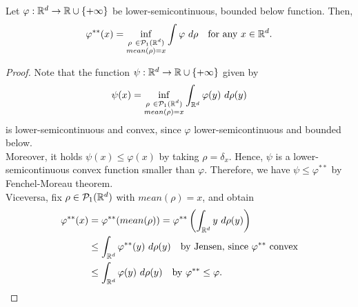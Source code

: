 \documentclass[../main.tex]{subfiles}
\begin{document}
\begin{lemma}
    \label{lemma:Fenchel-Moreau_cor}
    Let $\varphi: \mathbb{R}^d \to \mathbb{R}\cup\{+\infty\}$ be lower-semicontinuous, bounded below function. Then, 
    $$
    \varphi^{**}(x) = \inf_{\substack{\rho \ \in \mathcal{P}_1(\mathbb{R}^d) \\ mean(\rho) = x}} \int \varphi \ d\rho \quad \text{for any } x\in\mathbb{R}^d.
    $$
\end{lemma}
\begin{proof}
    Note that the function $\psi : \mathbb{R}^d \to \mathbb{R}\cup\{+\infty\}$ given by
    $$
    \psi(x) = \inf_{\substack{\rho \ \in \mathcal{P}_1(\R^d) \\ mean(\rho) = x}} \int_{\R^d} \varphi(y) \ d\rho(y)
    $$
    is lower-semicontinuous and convex, since $\varphi$ lower-semicontinuous and bounded below. \\
    Moreover, it holds $\psi(x) \leq \varphi(x)$ by taking $\rho = \delta_x$. Hence, $\psi$ is a lower-semicontinuous convex function smaller than $\varphi$. Therefore, we have $\psi\leq\varphi^{**}$ by Fenchel-Moreau theorem. \\
    Viceversa, fix $\rho\in\mathcal{P}_1(\mathbb{R}^d)$ with $mean(\rho) = x$, and obtain
    \begin{align*}
        \varphi^{**}(x) 
        &= \varphi^{**}(mean(\rho)) 
        = \varphi^{**}\left(\int_{\mathbb{R}^d} y \ d\rho(y)\right) \\
        &\leq \int_{\mathbb{R}^d} \varphi^{**}(y) \ d\rho(y) \quad \text{by Jensen, since $\varphi^{**}$ convex} \\
        &\leq \int_{\mathbb{R}^d} \varphi(y) \ d \rho(y) \quad \text{by } \varphi^{**} \leq \varphi.
    \end{align*}
\end{proof}
\end{document}
